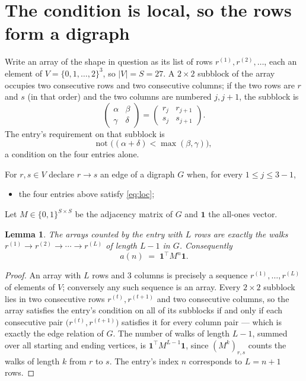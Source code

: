 \documentclass[11pt,a4paper]{article}
\theoremstyle{plain}
\newtheorem{lemma}[theorem]{Lemma}
\theoremstyle{definition}
\begin{document}
\section{The condition is local, so the rows form a digraph}

Write an array of the shape in question as its list of rows
$r^{(1)},r^{(2)},\dots$, each an element of
$V=\{0,1,\dots,2\}^{3}$, so $|V|=S=27$. A $2\times2$ subblock of the array
occupies two consecutive rows and two consecutive columns; if the two rows are $r$
and $s$ (in that order) and the two columns are numbered $j,j+1$,
the subblock is
\[
\begin{pmatrix}\alpha&\beta\\\gamma&\delta\end{pmatrix}=\begin{pmatrix}r_j&r_{j+1}\\s_j&s_{j+1}\end{pmatrix}.
\]
The entry's requirement on that subblock is
\begin{equation}\label{eq:loc}
\text{not }\bigl((\alpha+\delta)<\max(\beta,\gamma)\bigr),
\end{equation}
a condition on the four entries alone.

For $r,s\in V$ declare $r\to s$ an edge of a digraph $G$ when, for every
$1\le j\le 3-1$,
\begin{itemize}
\item the four entries above satisfy \eqref{eq:loc};

\end{itemize}
Let $M\in\{0,1\}^{S\times S}$ be the adjacency matrix of $G$ and $\mathbf{1}$ the
all-ones vector.

\begin{lemma}\label{lem:walk}
The arrays counted by the entry with $L$ rows are exactly the walks
$r^{(1)}\to r^{(2)}\to\cdots\to r^{(L)}$ of length $L-1$ in $G$. Consequently
\[
a(n)\;=\;\mathbf{1}^{\!\top}M^{n}\mathbf{1} .
\]
\end{lemma}

\begin{proof}
An array with $L$ rows and $3$ columns is precisely a sequence
$r^{(1)},\dots,r^{(L)}$ of elements of $V$; conversely any such sequence is an array.
Every $2\times2$ subblock lies in two consecutive rows $r^{(t)},r^{(t+1)}$ and two
consecutive columns, so the array satisfies the entry's condition on all of its subblocks
if and only if each consecutive pair $\bigl(r^{(t)},r^{(t+1)}\bigr)$ satisfies it for
every column pair --- which is exactly the edge relation of $G$. The number of walks of
length $L-1$, summed over all starting and ending vertices, is
$\mathbf{1}^{\!\top}M^{L-1}\mathbf{1}$, since $(M^{k})_{r,s}$ counts the walks of
length $k$ from $r$ to $s$. The entry's index $n$ corresponds to $L=n+1$ rows.
\end{proof}
\end{document}
